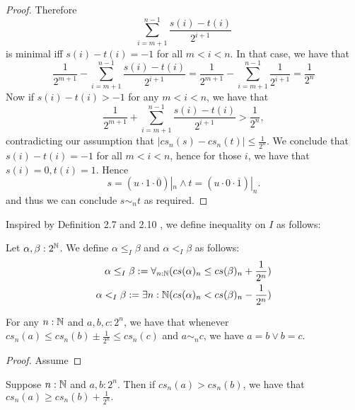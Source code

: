 \begin{proof}
  Therefore 
  $$\sum\limits_{i = m+1}^{n-1} \frac{s(i)-t(i)}{2^{i+1}}$$
  is minimal iff $s(i) -t(i) = -1$ for all $m<i<n$. 
  In that case, we have that 
  $$
  \frac{1}{2^{m+1}}-
  \sum\limits_{i = m+1}^{n-1} \frac{s(i)-t(i)}{2^{i+1}}= 
  \frac{1}{2^{m+1}}-
  \sum\limits_{i = m+1}^{n-1} \frac{1}{2^{i+1}}= 
  \frac{1}{2^n}
  $$
  Now if $s(i) -t(i) > -1$ for any $m<i<n$, we have that
    $$
    \frac{1}{2^{m+1}} + \sum\limits_{i = m+1}^{n-1} \frac{s(i)-t(i)}{2^{i+1}}> \frac{1}{2^n},$$
  contradicting our assumption that 
  $|cs_n(s) - cs_n(t)| \leq \frac{1}{2^n}$. 
  We conclude that $s(i) -t(i) = -1$ for all $m<i<n$, hence for those $i$, we have that 
  $s(i) = 0, t(i) = 1$. Hence 
  \begin{equation}
    s = (u \cdot 1\cdot \overline 0) |_n \wedge 
    t = (u \cdot 0\cdot \overline 1) |_n.
  \end{equation}
  and thus we can conclude $s\sim_n t$ as required. 
\end{proof}


Inspired by Definition 2.7 and 2.10 \Cite{Bishop}, 
we define inequality on $I$ as follows:
\begin{definition}
  Let $\alpha,\beta:2^{\mathbb{N}}$. 
  We define $\alpha\leq_I \beta$ and $\alpha<_I\beta$ as follows:
  \begin{align}
  \alpha\leq_I\beta : = \forall_{n:\mathbb{N}} ( cs(\alpha)_n \leq cs(\beta)_n + \frac {1} {2^n})\\ 
    \alpha   <_I \beta : = \exists{n:\mathbb{N}} ( cs(\alpha)_n < cs(\beta)_n - \frac {1} {2^n})
\end{align}
\end{definition}

\begin{lemma}\label{SqueezeLemma}
  For any $n:\mathbb{N}$ and $a,b,c:2^n$, we have that whenever 
  $cs_n(a) \leq cs_n(b)\pm\frac{1}{2^n} \leq cs_n(c)$ and $a\sim_n c$, we have 
  $a = b \vee b = c$. 
\end{lemma}
\begin{proof}
  Assume 
\end{proof}
\newpage

\begin{lemma}
  Suppose $n:\mathbb{N}$ and $a,b:2^n$. 
  Then if $cs_n(a) > cs_n(b)$, 
  we have that $cs_n(a) \geq  cs_n(b) +\frac{1}{2^n}.$
\end{lemma}



